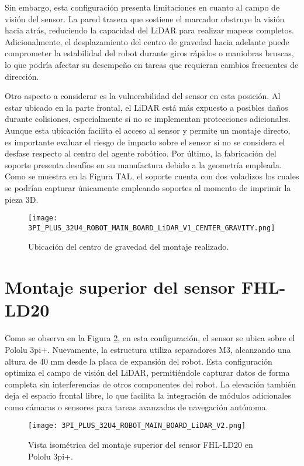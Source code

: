 Sin embargo, esta configuración presenta limitaciones en cuanto al campo de visión del sensor. La pared trasera que sostiene el marcador obstruye la visión hacia atrás, reduciendo la capacidad del LiDAR para realizar mapeos completos. Adicionalmente, el desplazamiento del centro de gravedad hacia adelante puede comprometer la estabilidad del robot durante giros rápidos o maniobras bruscas, lo que podría afectar su desempeño en tareas que requieran cambios frecuentes de dirección.

Otro aspecto a considerar es la vulnerabilidad del sensor en esta posición. Al estar ubicado en la parte frontal, el LiDAR está más expuesto a posibles daños durante colisiones, especialmente si no se implementan protecciones adicionales. Aunque esta ubicación facilita el acceso al sensor y permite un montaje directo, es importante evaluar el riesgo de impacto sobre el sensor si no se considera el desfase respecto al centro del agente robótico. Por último, la fabricación del soporte presenta desafíos en su manufactura debido a la geometría empleada. Como se muestra en la Figura TAL, el soporte cuenta con dos voladizos los cuales se podrían capturar únicamente empleando soportes al momento de imprimir la pieza 3D.

\begin{figure}[H]
	\centering
	\texttt{[image: 3PI\_PLUS\_32U4\_ROBOT\_MAIN\_BOARD\_LiDAR\_V1\_CENTER\_GRAVITY.png]}
	\caption{Ubicación del centro de gravedad del montaje realizado.}
	\label{fig:centro1}
\end{figure}

\section{Montaje superior del sensor FHL-LD20}

Como se observa en la Figura \ref{fig:montaje2}, en esta configuración, el sensor se ubica sobre el Pololu 3pi+. Nuevamente, la estructura utiliza separadores M3,  alcanzando una altura de 40 mm desde la placa de expansión del robot. Esta configuración optimiza el campo de visión del LiDAR, permitiéndole capturar datos de forma completa sin interferencias de otros componentes del robot.  La elevación también deja el espacio frontal libre, lo que facilita la integración de módulos adicionales como cámaras o sensores para tareas avanzadas de navegación autónoma.

\begin{figure}[H]
	\centering
	\texttt{[image: 3PI\_PLUS\_32U4\_ROBOT\_MAIN\_BOARD\_LiDAR\_V2.png]}
	\caption{Vista isométrica del montaje superior del sensor FHL-LD20 en Pololu 3pi+.}
	\label{fig:montaje2}
\end{figure}

